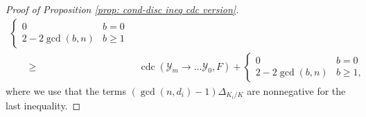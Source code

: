 \documentclass[12pt]{amsart}
\numberwithin{equation}{section}
\theoremstyle{definition}
\newcommand{\connor}[1]{{\color{Orange} \sf $\diamondsuit\diamondsuit\diamondsuit$ Connor: [#1]}}
\newcommand{\Y}{\mathcal{Y}}
\DeclareMathOperator{\disc}{disc}
\DeclareMathOperator{\Art}{Art}
\DeclareMathOperator{\db}{db}
\DeclareMathOperator{\cdc}{cdc}
\DeclareMathOperator{\HJL}{HJL}
\begin{document}
\begin{proof}[Proof of Proposition \ref{prop: cond-disc ineq cdc version}]
\begin{align*}
\begin{cases}
            0&b=0\\
            2-2\gcd(b,n)&b\geq1
        \end{cases} \\
         \quad\quad\geq &\ \cdc(\Y_m\to...\Y_0,F)+\begin{cases}
            0&b=0\\
            2-2\gcd(b,n)&b\geq1,
        \end{cases}
    \end{align*}
    where we use that the terms $(\gcd(n,d_i)-1)\Delta_{K_i/K}$ are nonnegative for the last inequality.
\end{proof}
\end{document}
